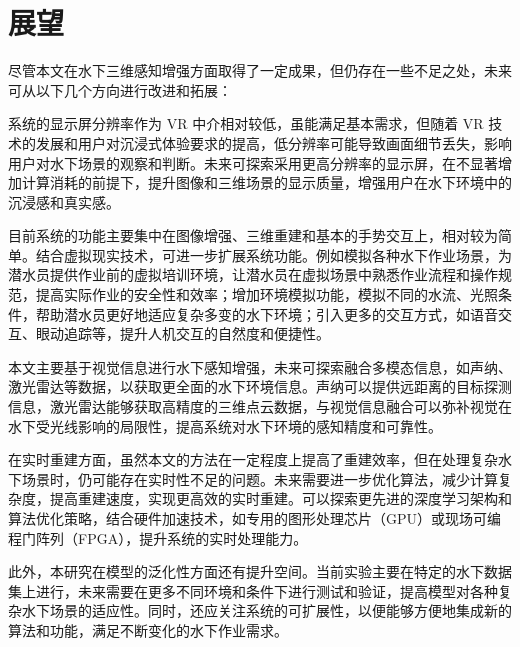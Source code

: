 \section{展望}
尽管本文在水下三维感知增强方面取得了一定成果，但仍存在一些不足之处，未来可从以下几个方向进行改进和拓展：

系统的显示屏分辨率作为 VR 中介相对较低，虽能满足基本需求，但随着 VR 技术的发展和用户对沉浸式体验要求的提高，低分辨率可能导致画面细节丢失，影响用户对水下场景的观察和判断。未来可探索采用更高分辨率的显示屏，在不显著增加计算消耗的前提下，提升图像和三维场景的显示质量，增强用户在水下环境中的沉浸感和真实感。

目前系统的功能主要集中在图像增强、三维重建和基本的手势交互上，相对较为简单。结合虚拟现实技术，可进一步扩展系统功能。例如模拟各种水下作业场景，为潜水员提供作业前的虚拟培训环境，让潜水员在虚拟场景中熟悉作业流程和操作规范，提高实际作业的安全性和效率；增加环境模拟功能，模拟不同的水流、光照条件，帮助潜水员更好地适应复杂多变的水下环境；引入更多的交互方式，如语音交互、眼动追踪等，提升人机交互的自然度和便捷性。

本文主要基于视觉信息进行水下感知增强，未来可探索融合多模态信息，如声纳、激光雷达等数据，以获取更全面的水下环境信息。声纳可以提供远距离的目标探测信息，激光雷达能够获取高精度的三维点云数据，与视觉信息融合可以弥补视觉在水下受光线影响的局限性，提高系统对水下环境的感知精度和可靠性。

在实时重建方面，虽然本文的方法在一定程度上提高了重建效率，但在处理复杂水下场景时，仍可能存在实时性不足的问题。未来需要进一步优化算法，减少计算复杂度，提高重建速度，实现更高效的实时重建。可以探索更先进的深度学习架构和算法优化策略，结合硬件加速技术，如专用的图形处理芯片（GPU）或现场可编程门阵列（FPGA），提升系统的实时处理能力。

此外，本研究在模型的泛化性方面还有提升空间。当前实验主要在特定的水下数据集上进行，未来需要在更多不同环境和条件下进行测试和验证，提高模型对各种复杂水下场景的适应性。同时，还应关注系统的可扩展性，以便能够方便地集成新的算法和功能，满足不断变化的水下作业需求。


